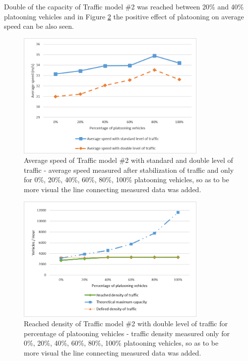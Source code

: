 Double of the capacity of Traffic model \#2 was reached between 20\% and 40\% platooning vehicles and  in Figure \ref{fig:5_6-2}  the positive effect of platooning on average speed can be also seen.


\begin{figure}[ph]
\centering
\includegraphics[width=0.82\textwidth,height=0.80\textheight,keepaspectratio]{figures/Chapter_5/5_M2_avgSpeed.png}
\centering
\protect\caption[Average speed of Traffic model \#2 with standard and double level of traffic]{\label{fig:5_6-1}Average speed of Traffic model \#2 with standard and double level of traffic - average speed measured after stabilization of traffic and only for 0\%, 20\%, 40\%, 60\%, 80\%, 100\% platooning vehicles, so as to be more visual the line connecting measured data was added.}
\end{figure}


\begin{figure}[ph]
\centering
\includegraphics[width=0.82\textwidth,height=0.80\textheight,keepaspectratio]{figures/Chapter_5/5_M2D_cap.png}
\centering
\protect\caption[Reached density of Traffic model \#2 with double level of traffic for  percentage of platooning vehicles]{\label{fig:5_6-2}Reached density of Traffic model \#2 with double level of traffic for  percentage of platooning vehicles - traffic density measured only for 0\%, 20\%, 40\%, 60\%, 80\%, 100\% platooning vehicles, so as to be more visual the line connecting measured data was added.}
\end{figure}